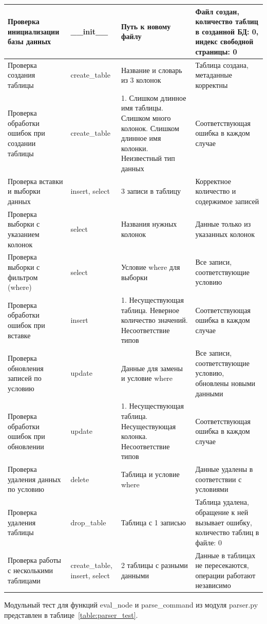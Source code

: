 \begin{xltabular}{\textwidth}{|X|X|X|X|}
	Проверка инициализации базы данных & \_\_init\_\_ & Путь к новому файлу &  Файл создан, количество таблиц в созданной БД: 0, индекс свободной страницы: 0 \\ \hline
	Проверка создания таблицы & create\_table & Название и словарь из 3 колонок & Таблица создана, метаданные корректны \\ \hline
	Проверка обработки ошибок при создании таблицы & create\_table & 1. Слишком длинное имя таблицы. Слишком много колонок. Слишком длинное имя колонки. Неизвестный тип данных & Соответствующая ошибка в каждом случае \\ \hline
	Проверка вставки и выборки данных & insert, select & 3 записи в таблицу & Корректное количество и содержимое записей \\ \hline
	Проверка выборки с указанием колонок & select & Названия нужных колонок & Данные только из указанных колонок \\ \hline
	Проверка выборки с фильтром (where) & select & Условие where для выборки & Все записи, соответствующие условию \\ \hline
	Проверка обработки ошибок при вставке & insert & 1. Несуществующая таблица. Неверное количество значений. Несоответствие типов & Соответствующая ошибка в каждом случае \\ \hline
	Проверка обновления записей по условию & update & Данные для замены и условие where & Все записи, соответствующие условию, обновлены новыми данными \\ \hline
	Проверка обработки ошибок при обновлении & update & 1. Несуществующая таблица. Несуществующая колонка. Несоответствие типов & Соответствующая ошибка в каждом случае \\ \hline
	Проверка удаления данных по условию & delete & Таблица и условие where & Данные удалены в соответствии с условиями \\ \hline
	Проверка удаления таблицы & drop\_table & Таблица с 1 записью & Таблица удалена, обращение к ней вызывает ошибку, количество таблиц в файле: 0 \\ \hline
	Проверка работы с несколькими таблицами & create\_table, insert, select & 2 таблицы с разными данными & Данные в таблицах не пересекаются, операции работают независимо \\ \hline
\end{xltabular}
\renewcommand{\arraystretch}{1.0}
\vspace{-\baselineskip}

Модульный тест для функций eval\_node и parse\_command из модуля parser.py представлен в таблице~\ref{table:parser_test}.

